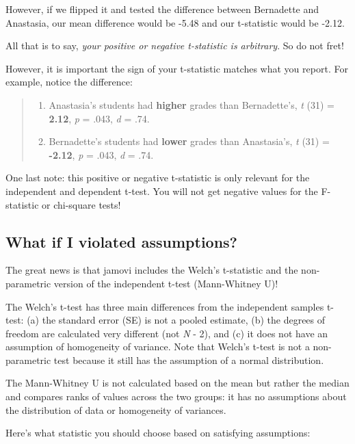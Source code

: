 \documentclass[
]{book}
\providecommand{\tightlist}{%
  \setlength{\itemsep}{0pt}\setlength{\parskip}{0pt}}
\begin{document}
However, if we flipped it and tested the difference between Bernadette and Anastasia, our mean difference would be -5.48 and our t-statistic would be -2.12.

All that is to say, \emph{your positive or negative t-statistic is arbitrary}. So do not fret!

However, it is important the sign of your t-statistic matches what you report. For example, notice the difference:

\begin{quote}
\begin{enumerate}
\def\labelenumi{\arabic{enumi}.}
\tightlist
\item
  Anastasia's students had \textbf{higher} grades than Bernadette's, \emph{t} (31) = \textbf{2.12}, \emph{p} = .043, \emph{d} = .74.
\item
  Bernadette's students had \textbf{lower} grades than Anastasia's, \emph{t} (31) = \textbf{-2.12}, \emph{p} = .043, \emph{d} = .74.
\end{enumerate}
\end{quote}

One last note: this positive or negative t-statistic is only relevant for the independent and dependent t-test. You will not get negative values for the F-statistic or chi-square tests!

\hypertarget{what-if-i-violated-assumptions}{%
\subsection{What if I violated assumptions?}\label{what-if-i-violated-assumptions}}

The great news is that jamovi includes the Welch's t-statistic and the non-parametric version of the independent t-test (Mann-Whitney U)!

The Welch's t-test has three main differences from the independent samples t-test: (a) the standard error (SE) is not a pooled estimate, (b) the degrees of freedom are calculated very different (not \emph{N} - 2), and (c) it does not have an assumption of homogeneity of variance. Note that Welch's t-test is not a non-parametric test because it still has the assumption of a normal distribution.

The Mann-Whitney U is not calculated based on the mean but rather the median and compares ranks of values across the two groups: it has no assumptions about the distribution of data or homogeneity of variances.

Here's what statistic you should choose based on satisfying assumptions:
\end{document}
